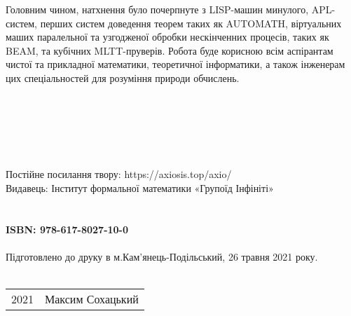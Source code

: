 Головним чином, натхнення було почерпнуте з
LISP-машин минулого, APL-систем, перших систем
доведення теорем таких як AUTOMATH, віртуальних
маших паралельної та узгодженої обробки нескінченних
процесів, таких як BEAM, та кубічних MLTT-пруверів.
Робота буде корисною всім аспірантам чистої та
прикладної математики, теоретичної інформатики,
а також інженерам цих спеціальностей для розуміння
природи обчислень.
\\
\\
\\
\\
\\
\\
\\
Постійне посилання твору: https://axiosis.top/axio/ \\
Видавець: Інститут формальної математики «Групоїд Інфініті» \\
\\
\\
{\textbf{ISBN: 978-617-8027-10-0} \hspace{2em}} \\ \\
Підготовлено до друку в м.Кам'янець-Подільський, 26 травня 2021 року.
\\
\\
\begin{tabular}{ll}
\textcopyright{} 2021 & Максим Сохацький
\end{tabular}

\tableofcontents*
\mainmatter
